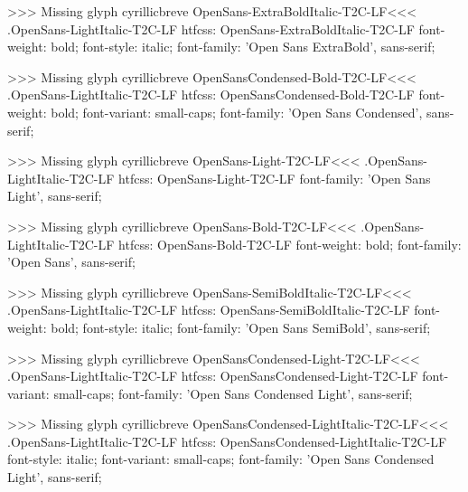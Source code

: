 >>>
Missing glyph	cyrillicbreve
\<OpenSans-ExtraBoldItalic-T2C-LF\><<<
.OpenSans-LightItalic-T2C-LF
htfcss:  OpenSans-ExtraBoldItalic-T2C-LF  font-weight: bold; font-style: italic; font-family: 'Open Sans ExtraBold', sans-serif;

>>>
Missing glyph	cyrillicbreve
\<OpenSansCondensed-Bold-T2C-LF\><<<
.OpenSans-LightItalic-T2C-LF
htfcss:  OpenSansCondensed-Bold-T2C-LF  font-weight: bold; font-variant: small-caps; font-family: 'Open Sans Condensed', sans-serif;

>>>
Missing glyph	cyrillicbreve
\<OpenSans-Light-T2C-LF\><<<
.OpenSans-LightItalic-T2C-LF
htfcss:  OpenSans-Light-T2C-LF  font-family: 'Open Sans Light', sans-serif;

>>>
Missing glyph	cyrillicbreve
\<OpenSans-Bold-T2C-LF\><<<
.OpenSans-LightItalic-T2C-LF
htfcss:  OpenSans-Bold-T2C-LF  font-weight: bold; font-family: 'Open Sans', sans-serif;

>>>
Missing glyph	cyrillicbreve
\<OpenSans-SemiBoldItalic-T2C-LF\><<<
.OpenSans-LightItalic-T2C-LF
htfcss:  OpenSans-SemiBoldItalic-T2C-LF  font-weight: bold; font-style: italic; font-family: 'Open Sans SemiBold', sans-serif;

>>>
Missing glyph	cyrillicbreve
\<OpenSansCondensed-Light-T2C-LF\><<<
.OpenSans-LightItalic-T2C-LF
htfcss:  OpenSansCondensed-Light-T2C-LF  font-variant: small-caps; font-family: 'Open Sans Condensed Light', sans-serif;

>>>
Missing glyph	cyrillicbreve
\<OpenSansCondensed-LightItalic-T2C-LF\><<<
.OpenSans-LightItalic-T2C-LF
htfcss:  OpenSansCondensed-LightItalic-T2C-LF  font-style: italic; font-variant: small-caps; font-family: 'Open Sans Condensed Light', sans-serif;

